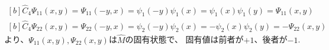 \documentclass[../ap_2023.tex]{subfiles}
\begin{document}
\subsection{}
\begin{equation}\begin{aligned}[b]
    \hat{C}_4\Psi_{11}(x,y)
    =\Psi_{11}(-y,x)
    =\psi_1(-y)\psi_1(x)
    =\psi_1(x)\psi_1(y)
    =\Psi_{11}(x,y)
\end{aligned}\end{equation}
\begin{equation}\begin{aligned}[b]
    \hat{C}_4\Psi_{22}(x,y)
    =\Psi_{22}(-y,x)
    =\psi_2(-y)\psi_2(x)
    =-\psi_2(x)\psi_2(y)
    =-\Psi_{22}(x,y)
\end{aligned}\end{equation}
より、\(\Psi_{11}(x,y),\Psi_{22}(x,y)\)は\(\hat{M}\)の固有状態で、
固有値は前者が\(+1\)、後者が\(-1\).
\end{document}
